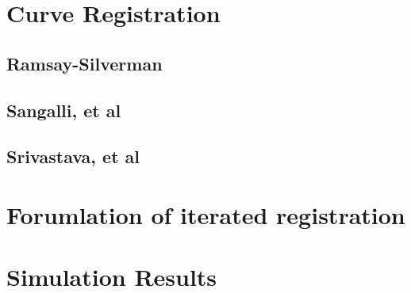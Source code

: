 \section{Curve Registration}
\subsection{Ramsay-Silverman}
\subsection{Sangalli, et al}
\subsection{Srivastava, et al}

\section{Forumlation of iterated registration}

\section{Simulation Results}


